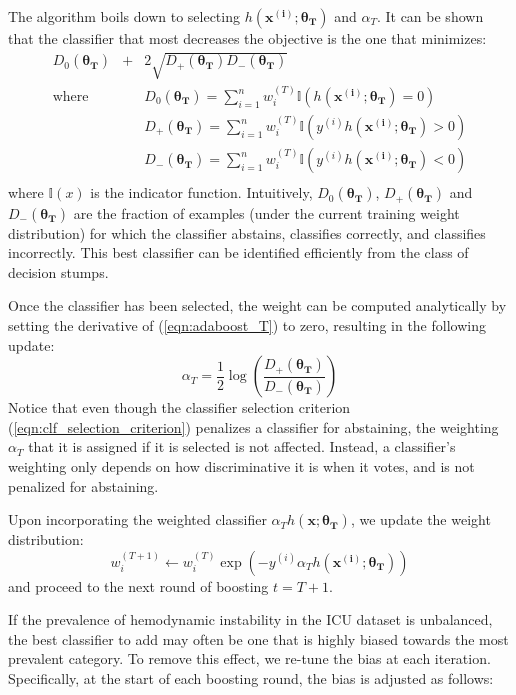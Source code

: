 \documentclass[
   technote
]{phildoc}
\begin{document}
The algorithm boils down to selecting $h(\bm{x^{(i)}}; \bm{\theta_T})$ and $\alpha_T$.  It can be shown \cite{Schapire:1999} that the classifier that most decreases the objective is the one that minimizes:
\begin{eqnarray}
D_0(\bm{\theta_T}) &+& 2\sqrt{D_{+}(\bm{\theta_T})D_{-}(\bm{\theta_T})} \label{eqn:clf_selection_criterion} \\ 
\text{where} & & D_0(\bm{\theta_T}) = \sum_{i=1}^n w_i^{(T)} \mathbb{I}(h(\bm{x^{(i)}};\bm{\theta_T}) = 0) \\
			 & & D_{+}(\bm{\theta_T}) = \sum_{i=1}^n w_i^{(T)} \mathbb{I}(y^{(i)}h(\bm{x^{(i)}};\bm{\theta_T}) > 0) \\
			 & & D_{-}(\bm{\theta_T}) = \sum_{i=1}^n w_i^{(T)} \mathbb{I}(y^{(i)}h(\bm{x^{(i)}};\bm{\theta_T}) < 0) \\
\end{eqnarray}
where $\mathbb{I}(x)$ is the indicator function.  Intuitively, $D_0(\bm{\theta_T})$, $D_{+}(\bm{\theta_T})$ and $D_{-}(\bm{\theta_T})$ are the fraction of examples (under the current training weight distribution) for which the classifier abstains, classifies correctly, and classifies incorrectly.
This best classifier can be identified efficiently from the class of decision stumps.

Once the classifier has been selected, the weight can be computed analytically by setting the derivative of (\ref{eqn:adaboost_T}) to zero, resulting in the following update:
\begin{equation}
\alpha_T = \frac{1}{2} \log\left(\frac{D_{+}(\bm{\theta_T})}{D_{-}(\bm{\theta_T})}\right)
\end{equation}
Notice that even though the classifier selection criterion (\ref{eqn:clf_selection_criterion}) penalizes a classifier for abstaining, the weighting $\alpha_T$ that it is assigned if it is selected is not affected.  Instead, a classifier's weighting only depends on how discriminative it is when it votes, and is not penalized for abstaining.

Upon incorporating the weighted classifier $\alpha_Th(\bm{x};\bm{\theta_T})$, we update the weight distribution:
\begin{equation}
w_i^{(T+1)} \gets w_i^{(T)} \exp\left(-y^{(i)} \alpha_T h(\bm{x^{(i)}};\bm{\theta_T})\right)
\end{equation}
and proceed to the next round of boosting $t=T+1$.

If the prevalence of hemodynamic instability in the ICU dataset is unbalanced, the best classifier to add may often be one that is highly biased towards the most prevalent category.  To remove this effect, we re-tune the bias at each iteration.  Specifically, at the start of each boosting round, the bias is adjusted as follows:
\end{document}
